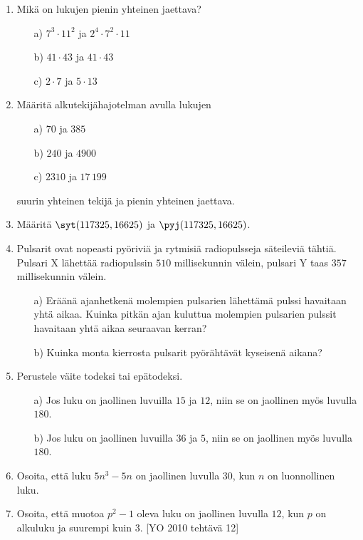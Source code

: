 \begin{enumerate}
\item Mikä on lukujen pienin yhteinen jaettava?
\begin{itemize}
\item[a)] $7^3 \cdot 11^2$ ja $2^4 \cdot 7^2 \cdot 11$
\item[b)] $41 \cdot 43$ ja $41 \cdot 43$
\item[c)] $2 \cdot 7$ ja $5 \cdot 13$
\end{itemize}

\item Määritä alkutekijähajotelman avulla lukujen
\begin{itemize}
\item[a)] $70$ ja $385$
\item[b)] $240$ ja $4900$
\item[c)] $2310$ ja $17\, 199$
\end{itemize}
suurin yhteinen tekijä ja pienin yhteinen jaettava.

\item
Määritä $\syt(117325,16625)$ ja $\pyj(117325,16625)$.

\item Pulsarit ovat nopeasti pyöriviä ja rytmisiä radiopulsseja
säteileviä tähtiä. Pulsari X lähettää radiopulssin $510$
millisekunnin välein, pulsari Y taas $357$ millisekunnin välein.

\begin{itemize}
\item[a)] Eräänä ajanhetkenä molempien pulsarien lähettämä pulssi
havaitaan yhtä aikaa. Kuinka pitkän ajan kuluttua molempien
pulsarien pulssit havaitaan yhtä aikaa seuraavan kerran?
\item[b)] Kuinka monta kierrosta pulsarit pyörähtävät kyseisenä
aikana?
\end{itemize}

\item Perustele väite todeksi tai epätodeksi.
\begin{itemize}
\item[a)] Jos luku on jaollinen luvuilla $15$ ja $12$, niin se on
jaollinen myös luvulla $180$.
\item[b)] Jos luku on jaollinen luvuilla $36$ ja $5$, niin se on
jaollinen myös luvulla $180$.
\end{itemize}

\item
Osoita, että luku $5n^3 - 5n$ on jaollinen luvulla $30$, kun $n$
on luonnollinen luku.

\item Osoita, että muotoa $p^2 - 1$ oleva luku on jaollinen
luvulla $12$, kun $p$ on alkuluku ja suurempi kuin $3$. [YO 2010
tehtävä 12]


\end{enumerate}
